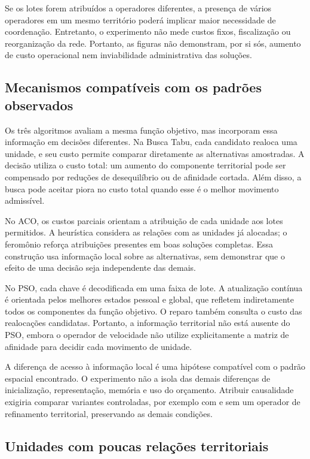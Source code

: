 \documentclass[12pt,a4paper]{article}
\begin{document}
Se os lotes forem atribuídos a operadores diferentes, a presença de vários operadores em
um mesmo território poderá implicar maior necessidade de coordenação. Entretanto, o
experimento não mede custos fixos, fiscalização ou reorganização da rede. Portanto, as
figuras não demonstram, por si sós, aumento de custo operacional nem inviabilidade
administrativa das soluções.

\subsection{Mecanismos compatíveis com os padrões observados}

Os três algoritmos avaliam a mesma função objetivo, mas incorporam essa informação em
decisões diferentes. Na Busca Tabu, cada candidato realoca uma unidade, e seu custo
permite comparar diretamente as alternativas amostradas. A decisão utiliza o custo
total: um aumento do componente territorial pode ser compensado por reduções de
desequilíbrio ou de afinidade cortada. Além disso, a busca pode aceitar piora no custo
total quando esse é o melhor movimento admissível.

No ACO, os custos parciais orientam a atribuição de cada unidade aos lotes permitidos. A
heurística considera as relações com as unidades já alocadas; o feromônio reforça
atribuições presentes em boas soluções completas. Essa construção usa informação local
sobre as alternativas, sem demonstrar que o efeito de uma decisão seja independente das
demais.

No PSO, cada chave é decodificada em uma faixa de lote. A atualização contínua é
orientada pelos melhores estados pessoal e global, que refletem indiretamente todos os
componentes da função objetivo. O reparo também consulta o custo das realocações
candidatas. Portanto, a informação territorial não está ausente do PSO, embora o
operador de velocidade não utilize explicitamente a matriz de afinidade para decidir
cada movimento de unidade.

A diferença de acesso à informação local é uma hipótese compatível com o padrão espacial
encontrado. O experimento não a isola das demais diferenças de inicialização,
representação, memória e uso do orçamento. Atribuir causalidade exigiria comparar
variantes controladas, por exemplo com e sem um operador de refinamento territorial,
preservando as demais condições.

\subsection{Unidades com poucas relações territoriais}
\end{document}
